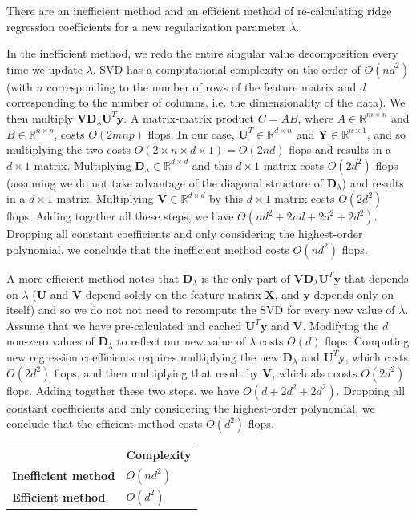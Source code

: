\documentclass{article}
\begin{document}
There are an inefficient method and an efficient method of re-calculating ridge
regression coefficients for a new regularization parameter $\lambda$.

In the inefficient method, we redo the entire singular value decomposition every
time we update $\lambda$. SVD has a computational complexity on the order of
$O(nd^2)$ (with $n$ corresponding to the number of rows of the feature matrix and 
$d$ corresponding to the number of columns, i.e. the dimensionality of the
data). We then multiply $\mathbf{VD}_\lambda \mathbf{U}^T\mathbf{y}$.
A matrix-matrix product $C=AB$, where $A \in \mathbb{R}^{m \times n}$ and $B \in
\mathbb{R}^{n \times p}$, costs $O(2mnp)$ flops. In our case, $\mathbf{U}^T \in
\mathbb{R}^{d \times n}$ and $\mathbf{Y} \in \mathbb{R}^{n \times 1}$, and so
multiplying the two costs $O(2 \times n \times d \times 1) = O(2nd)$ flops and results
in a $d \times 1$ matrix. Multiplying $\mathbf{D}_\lambda \in \mathbb{R}^{d
\times d}$ and this $d \times 1$ matrix costs $O(2d^2)$ flops (assuming we do not take advantage of the
diagonal structure of $\mathbf{D}_\lambda$) and results in a $d \times 1$ matrix. 
Multiplying $\mathbf{V} \in \mathbb{R}^{d \times d}$ by this $d \times 1$ matrix costs 
$O(2d^2)$ flops. Adding together all these steps, we have $O(nd^2 + 2nd + 2d^2 +
2d^2)$. Dropping all constant coefficients and only considering the
highest-order polynomial, we conclude that the inefficient method costs
$O(nd^2)$ flops.

A more efficient method notes that $\mathbf{D}_\lambda$ is the only part of 
$\mathbf{VD}_\lambda \mathbf{U}^T\mathbf{y}$ that depends on $\lambda$
($\mathbf{U}$ and $\mathbf{V}$ depend solely on the feature matrix $\mathbf{X}$, and
$\mathbf{y}$  depends only on itself) and so we do not not need to recompute the
SVD for every new value of $\lambda$. Assume that we have pre-calculated and
cached $\mathbf{U}^T\mathbf{y}$ and $\mathbf{V}$. Modifying the $d$ non-zero
values of $\mathbf{D}_\lambda$ to reflect our new value of $\lambda$ costs $O(d)$ flops. 
Computing new regression coefficients requires multiplying the new $\mathbf{D}_\lambda$ and
$\mathbf{U}^T\mathbf{y}$, which costs $O(2d^2)$ flops, and then multiplying that
result by $\mathbf{V}$, which also costs $O(2d^2)$ flops. Adding together these
two steps, we have $O(d + 2d^2 + 2d^2)$. Dropping all constant coefficients and
only considering the highest-order polynomial, we conclude that the efficient method
costs $O(d^2)$ flops. 

\begin{centering}
\begin{table}[h!]
	\begin{tabular}{|l|l|}
		\hline
		& \textbf{Complexity} \\
		\textbf{Inefficient method} & $O(nd^2)$ \\
		\textbf{Efficient method} & $O(d^2)$ \\
		\hline
	\end{tabular}
\end{table}
\end{centering}
\end{document}
